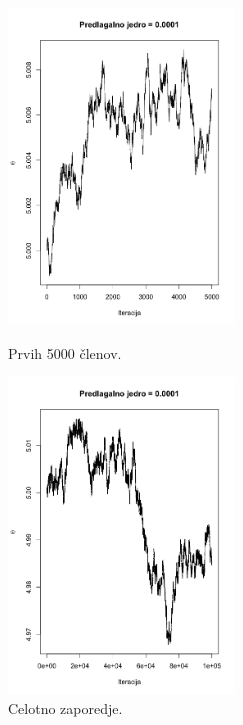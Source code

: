 \documentclass[a4paper,11pt]{article}
\begin{document}
    \begin{figure}[ht!]
        \begin{minipage}{0.5\textwidth}
            \centering
            \includegraphics[width = 60mm]{Slike/4_1a_S.png}
            \caption{Prvih 5000 členov.}
        \end{minipage}
        \begin{minipage}{0.5\textwidth}
            \centering
            \includegraphics[width = 60mm]{Slike/4_1a_celotno.png}
            \caption{Celotno zaporedje.}
        \end{minipage}
    \end{figure}
\end{document}
